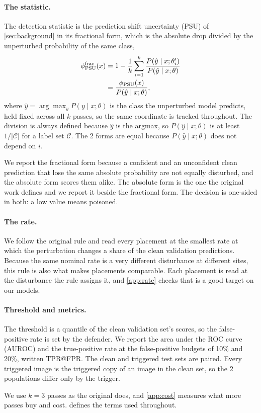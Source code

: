 \paragraph{The statistic.}
The detection statistic is the prediction shift uncertainty (PSU) of
\cref{sec:background} in its fractional form, which is the absolute drop divided
by the unperturbed probability of the same class,
\begin{equation}
  \begin{split}
    \phi_{\mathrm{PSU}}^{\mathrm{frac}}(x)
      &= 1 - \frac{1}{k}\sum_{i=1}^{k}
        \frac{P(\hat y \mid x;\theta'_i)}{P(\hat y \mid x;\theta)} \\
      &= \frac{\phi_{\mathrm{PSU}}(x)}{P(\hat y \mid x;\theta)},
  \end{split}
  \label{eq:psu-fractional}
\end{equation}
where $\hat y = \arg\max_{y} P(y \mid x;\theta)$ is the class the unperturbed
model predicts, held fixed across all $k$ passes, so the same coordinate is tracked throughout. The
division is always defined because $\hat y$ is the argmax, so
$P(\hat y \mid x;\theta)$ is at least $1/|\mathcal{C}|$ for a label set
$\mathcal{C}$. The 2 forms are equal because $P(\hat y \mid x;\theta)$ does
not depend on $i$.

We report the fractional form because a confident and an unconfident clean prediction that lose the same absolute probability are not equally disturbed, and the absolute form scores them alike. The absolute form is the one the original work defines and we report it beside the fractional form. The decision is one-sided in both: a low value means poisoned.

\paragraph{The rate.}
We follow the original rule and read every placement at the smallest rate at which the perturbation changes a share \AdaptiveShiftTarget{} of the clean validation predictions. Because the same nominal rate is a very different disturbance at different sites, this rule is also what makes placements comparable. Each placement is read at the disturbance the rule assigns it, and \cref{app:rate} checks that \AdaptiveShiftTarget{} is a good target on our models.

\paragraph{Threshold and metrics.}
The threshold is a quantile of the clean validation set's scores, so the false-positive rate is set by the defender. We report the area under the ROC curve (AUROC) and the true-positive rate at the false-positive budgets of 10\% and 20\%, written TPR@FPR. The clean and triggered test sets are paired. Every triggered image is the triggered copy of an image in the clean set, so the 2 populations differ only by the trigger.

We use $k = 3$ passes as the original does, and \cref{app:cost} measures what more passes buy and cost.  defines the terms used throughout.
